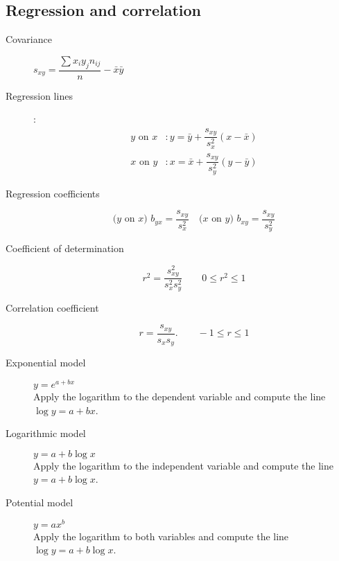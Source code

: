 \begin{multicols*}{2}
	\subsection*{Regression and correlation}

	\begin{tcolorbox}[hbox, title=Linear regression]
		\begin{minipage}{0.4\textwidth}
			\begin{description}
				\item [Covariance] $s_{xy}=\dfrac{\sum x_iy_jn_{ij}}{n}-\bar{x}\bar{y}$
				\item [Regression lines]:
				      \begin{align*}
					      \mbox{$y$ on $x$} & : y=\bar{y}+\dfrac{s_{xy}}{s_x^2}(x-\bar{x}) \\
					      \mbox{$x$ on $y$} & : x=\bar{x}+\dfrac{s_{xy}}{s_y^2}(y-\bar{y})
				      \end{align*}
				\item [Regression coefficients]
				      \[
					      \mbox{($y$ on $x$) } b_{yx}=\dfrac{s_{xy}}{s_x^2}\quad \mbox{($x$ on
						      $y$) } b_{xy}=\dfrac{s_{xy}}{s_y^2}
				      \]
				\item[Coefficient of determination]
				      \[r^2=\dfrac{s_{xy}^2}{s_x^2s_y^2} \qquad 0\leq r^2\leq 1\]
				\item[Correlation coefficient]
				      \[r=\dfrac{s_{xy}}{s_xs_y}.\qquad -1\leq r\leq 1\]
			\end{description}
		\end{minipage}
	\end{tcolorbox}

	\medskip

	\begin{tcolorbox}[hbox, title=Non-linear regression]
		\begin{minipage}{0.4\textwidth}
			\begin{description}
				\item[Exponential model] $y=e^{a+bx}$\\
				      Apply the logarithm to the dependent variable and compute the line $\log y = a+bx$.
				\item[Logarithmic model] $y=a+b\log x$\\
				      Apply the logarithm to the independent variable and compute the line $y=a+b\log x$.
				\item[Potential model] $y=ax^b$\\
				      Apply the logarithm to both variables and compute the line $\log y = a+b\log x$.
			\end{description}
		\end{minipage}
	\end{tcolorbox}


\end{multicols*}
